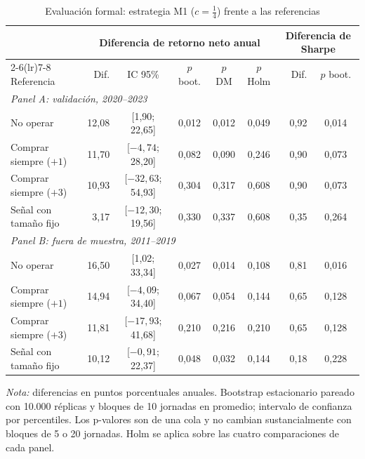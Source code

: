 \documentclass[11pt,a4paper]{article}
\begin{document}
\begin{table}[htbp]\centering\small
\caption{Evaluación formal: estrategia M1 ($c=\tfrac14$) frente a las referencias}\label{tab:formal}
\begin{threeparttable}
\begin{tabular}{l r c ccc rc}
\toprule
 & \multicolumn{5}{c}{Diferencia de retorno neto anual} & \multicolumn{2}{c}{Diferencia de Sharpe} \\
\cmidrule(lr){2-6}\cmidrule(lr){7-8}
Referencia & Dif. & IC 95\% & $p$ boot. & $p$ DM & $p$ Holm & Dif. & $p$ boot. \\
\midrule
\multicolumn{8}{l}{\emph{Panel A: validación, 2020--2023}} \\
No operar & 12,08 & [1,90; 22,65] & 0,012 & 0,012 & 0,049 & 0,92 & 0,014 \\
Comprar siempre ($+1$) & 11,70 & [$-4{,}74$; 28,20] & 0,082 & 0,090 & 0,246 & 0,90 & 0,073 \\
Comprar siempre ($+3$) & 10,93 & [$-32{,}63$; 54,93] & 0,304 & 0,317 & 0,608 & 0,90 & 0,073 \\
Señal con tamaño fijo & 3,17 & [$-12{,}30$; 19,56] & 0,330 & 0,337 & 0,608 & 0,35 & 0,264 \\
\midrule
\multicolumn{8}{l}{\emph{Panel B: fuera de muestra, 2011--2019}} \\
No operar & 16,50 & [1,02; 33,34] & 0,027 & 0,014 & 0,108 & 0,81 & 0,016 \\
Comprar siempre ($+1$) & 14,94 & [$-4{,}09$; 34,40] & 0,067 & 0,054 & 0,144 & 0,65 & 0,128 \\
Comprar siempre ($+3$) & 11,81 & [$-17{,}93$; 41,68] & 0,210 & 0,216 & 0,210 & 0,65 & 0,128 \\
Señal con tamaño fijo & 10,12 & [$-0{,}91$; 22,37] & 0,048 & 0,032 & 0,144 & 0,18 & 0,228 \\
\bottomrule
\end{tabular}
\begin{tablenotes}\footnotesize
\item \emph{Nota:} diferencias en puntos porcentuales anuales. Bootstrap estacionario pareado con 10.000 réplicas y bloques de 10 jornadas en promedio; intervalo de confianza por percentiles. Los p-valores son de una cola y no cambian sustancialmente con bloques de 5 o 20 jornadas. Holm se aplica sobre las cuatro comparaciones de cada panel.
\end{tablenotes}
\end{threeparttable}
\end{table}
\end{document}
